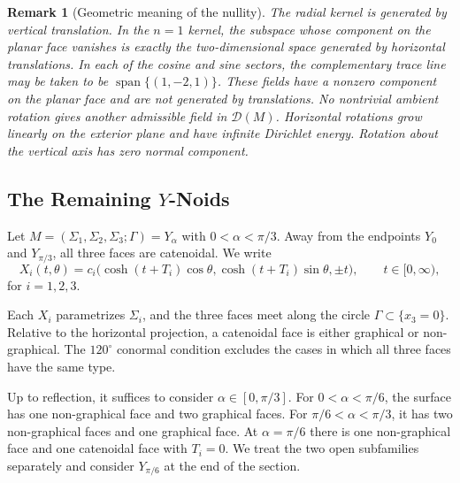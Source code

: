 \documentclass[11pt,twoside]{amsart}
\newtheorem{rem}[thm]{\bf{Remark}}
\numberwithin{equation}{section}
\begin{document}
\begin{rem}[Geometric meaning of the nullity] \label{rem: geometric meaning pseudo ycat}
\rm
The radial kernel is generated by vertical translation. In the $n=1$ kernel, the subspace whose component on the planar face vanishes is exactly the two-dimensional space generated by horizontal translations. In each of the cosine and sine sectors, the complementary trace line may be taken to be $\operatorname{span}\{(1,-2,1)\}$. These fields have a nonzero component on the planar face and are not generated by translations. No nontrivial ambient rotation gives another admissible field in $\mathcal D(M)$. Horizontal rotations grow linearly on the exterior plane and have infinite Dirichlet energy. Rotation about the vertical axis has zero normal component.
\end{rem}

 

\subsection{The Remaining \texorpdfstring{$Y$}{Y}-Noids} \label{sec: index of rest of family}
Let $M=(\Sigma_1,\Sigma_2,\Sigma_3;\Gamma)=Y_\alpha$ with $0<\alpha<\pi/3$. Away from the endpoints $Y_0$ and $Y_{\pi/3}$, all three faces are catenoidal. We write
\begin{equation}
\label{eqn: y-noids family maps}
\nonumber
X_i (t,\theta ) = c_i \big( \cosh  (t  + T_i ) \cos \theta ,  \cosh   (t + T_i ) \sin \theta ,    \pm t \big), \qquad t\in [0,\infty),  
\end{equation}
for $i = 1, 2, 3$. 
\medskip

 
Each $X_i$ parametrizes $\Sigma_i$, and the three faces meet along the circle $\Gamma\subset\{x_3=0\}$. Relative to the horizontal projection, a catenoidal face is either graphical or non-graphical. The $120^\circ$ conormal condition excludes the cases in which all three faces have the same type.

Up to reflection, it suffices to consider $\alpha\in[0,\pi/3]$. For $0<\alpha<\pi/6$, the surface has one non-graphical face and two graphical faces. For $\pi/6<\alpha<\pi/3$, it has two non-graphical faces and one graphical face. At $\alpha=\pi/6$ there is one non-graphical face and one catenoidal face with $T_i=0$. We treat the two open subfamilies separately and consider $Y_{\pi/6}$ at the end of the section.
\medskip
\end{document}
